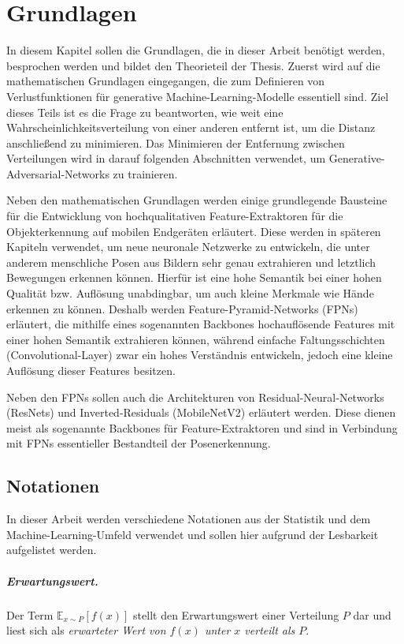 \chapter{Grundlagen}\label{chapter:basics}
In diesem Kapitel sollen die Grundlagen, die in dieser Arbeit benötigt werden, besprochen werden und bildet den Theorieteil der Thesis. Zuerst wird auf die mathematischen Grundlagen eingegangen, die zum Definieren von Verlustfunktionen für generative Machine-Learning-Modelle essentiell sind. Ziel dieses Teils ist es die Frage zu beantworten, wie weit eine Wahrscheinlichkeitsverteilung von einer anderen entfernt ist, um die Distanz anschließend zu minimieren. Das Minimieren der Entfernung zwischen Verteilungen wird in darauf folgenden Abschnitten verwendet, um Generative-Adversarial-Networks zu trainieren.

Neben den mathematischen Grundlagen werden einige grundlegende Bausteine für die
Entwicklung von hochqualitativen Feature-Extraktoren für die Objekterkennung auf
mobilen Endgeräten erläutert. Diese werden in späteren Kapiteln verwendet, um
neue neuronale Netzwerke zu entwickeln, die unter anderem menschliche Posen aus
Bildern sehr genau extrahieren und letztlich Bewegungen erkennen können. Hierfür
ist eine hohe Semantik bei einer hohen Qualität bzw. Auflösung unabdingbar, um
auch kleine Merkmale wie Hände erkennen zu können. Deshalb werden
Feature-Pyramid-Networks (FPNs) erläutert, die mithilfe eines sogenannten
Backbones hochauflösende Features mit einer hohen Semantik extrahieren können, während einfache Faltungsschichten (Convolutional-Layer) zwar ein hohes
Verständnis entwickeln, jedoch eine kleine Auflösung dieser Features besitzen.

Neben den FPNs sollen auch die Architekturen von Residual-Neural-Networks (ResNets) und Inverted-Residuals (MobileNetV2) erläutert werden. Diese dienen meist als sogenannte Backbones für Feature-Extraktoren und sind in Verbindung mit FPNs essentieller Bestandteil der Posenerkennung.

\section{Notationen}
In dieser Arbeit werden verschiedene Notationen aus der Statistik und dem
Machine-Learning-Umfeld verwendet und sollen hier aufgrund der Lesbarkeit
aufgelistet werden.

\paragraph{Erwartungswert.}
Der Term $\mathbb{E}_{x \sim P}\left[f(x)\right]$ stellt den Erwartungswert
einer Verteilung $P$ dar und liest sich als \textit{erwarteter Wert von
$f(x)$ unter $x$ verteilt als $P$}.

